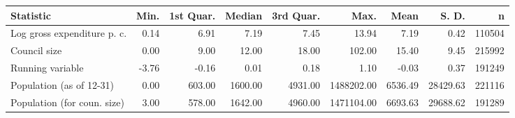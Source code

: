 \begin{tabular}{lrrrrrrrr}
  \toprule
Statistic & Min. & 1st Quar. & Median & 3rd Quar. & Max. & Mean & S. D. & n \\ 
  \midrule
Log gross expenditure p. c. & 0.14 & 6.91 & 7.19 & 7.45 & 13.94 & 7.19 & 0.42 & 110504 \\ 
  Council size & 0.00 & 9.00 & 12.00 & 18.00 & 102.00 & 15.40 & 9.45 & 215992 \\ 
  Running variable & -3.76 & -0.16 & 0.01 & 0.18 & 1.10 & -0.03 & 0.37 & 191249 \\ 
  Population (as of 12-31) & 0.00 & 603.00 & 1600.00 & 4931.00 & 1488202.00 & 6536.49 & 28429.63 & 221116 \\ 
  Population (for coun. size) & 3.00 & 578.00 & 1642.00 & 4960.00 & 1471104.00 & 6693.63 & 29688.62 & 191289 \\ 
   \bottomrule
\end{tabular}
